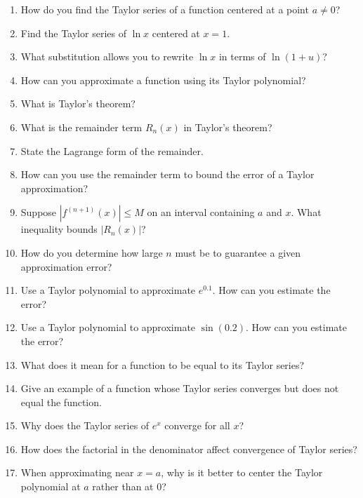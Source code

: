 \begin{enumerate}
  \item How do you find the Taylor series of a function centered at a point $a \neq 0$?
  \item Find the Taylor series of $\ln x$ centered at $x=1$.
  \item What substitution allows you to rewrite $\ln x$ in terms of $\ln(1+u)$?
  \item How can you approximate a function using its Taylor polynomial?
  \item What is Taylor's theorem?
  \item What is the remainder term $R_n(x)$ in Taylor's theorem?
  \item State the Lagrange form of the remainder.
  \item How can you use the remainder term to bound the error of a Taylor approximation?
  \item Suppose $|f^{(n+1)}(x)| \le M$ on an interval containing $a$ and $x$. What inequality bounds $|R_n(x)|$?
  \item How do you determine how large $n$ must be to guarantee a given approximation error?
  \item Use a Taylor polynomial to approximate $e^{0.1}$. How can you estimate the error?
  \item Use a Taylor polynomial to approximate $\sin(0.2)$. How can you estimate the error?
  \item What does it mean for a function to be equal to its Taylor series?
  \item Give an example of a function whose Taylor series converges but does not equal the function.
  \item Why does the Taylor series of $e^x$ converge for all $x$?
  \item How does the factorial in the denominator affect convergence of Taylor series?
  \item When approximating near $x=a$, why is it better to center the Taylor polynomial at $a$ rather than at $0$?
\end{enumerate}
